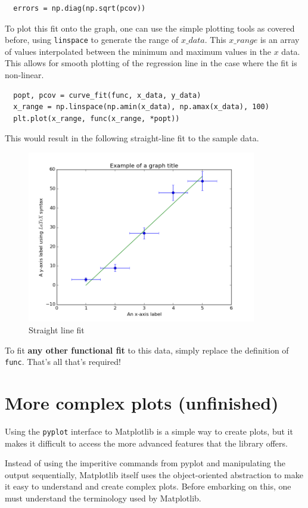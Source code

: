 \documentclass{article}
\begin{document}
\begin{lstlisting}
  errors = np.diag(np.sqrt(pcov))
\end{lstlisting}

To plot this fit onto the graph, one can use the simple plotting tools
as covered before, using \texttt{linspace} to generate the range of
$x\_data$. This $x\_range$ is an array of values interpolated between
the minimum and maximum values in the $x$ data. This allows for smooth
plotting of the regression line in the case where the fit is
non-linear.

\begin{lstlisting}  
  popt, pcov = curve_fit(func, x_data, y_data)
  x_range = np.linspace(np.amin(x_data), np.amax(x_data), 100)
  plt.plot(x_range, func(x_range, *popt))
\end{lstlisting}

This would result in the following straight-line fit to the sample
data.

\begin{figure}[H]
  \centering
  \includegraphics[width=10cm]{ch4}
  \caption{Straight line fit}
  \label{fig:ch4}
\end{figure}

To fit \textbf{any other functional fit} to this data, simply replace
the definition of \texttt{func}. That's all that's required!

\section{More complex plots (unfinished)}
Using the \texttt{pyplot} interface to Matplotlib is a simple way to
create plots, but it makes it difficult to access the more advanced
features that the library offers.

Instead of using the imperitive commands from pyplot and manipulating
the output sequentially, Matplotlib itself uses the object-oriented
abstraction to make it easy to understand and create complex
plots. Before embarking on this, one must understand the terminology
used by Matplotlib.
\end{document}
